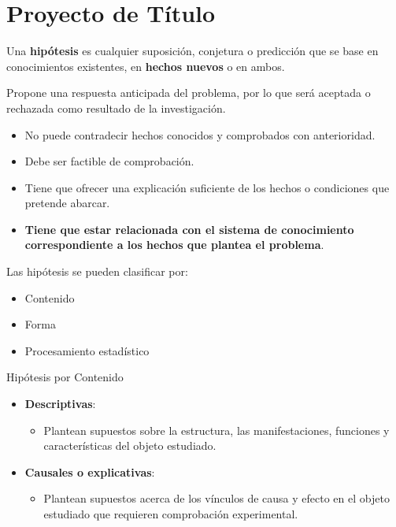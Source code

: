 \documentclass[letter,12pt]{report}
\newcommand\naranjo[1]{\textcolor[rgb]{1.00,0.36,0.06}{\textbf{#1}}}
\begin{document}
\chapter{Proyecto de Título}
Una \naranjo{hipótesis} es cualquier suposición, conjetura o predicción que se base en conocimientos existentes, en \naranjo{hechos nuevos} o en ambos.

 Propone una respuesta anticipada del problema, por lo que será aceptada o rechazada como resultado de la investigación.

\begin{itemize}
  \item No puede contradecir hechos conocidos y comprobados con anterioridad.
  \item Debe ser factible de comprobación.
  \item Tiene que ofrecer una explicación suficiente de los hechos o condiciones que pretende abarcar.
  \item \naranjo{Tiene que estar relacionada con el sistema de conocimiento correspondiente a los hechos que plantea el problema}.
\end{itemize}

Las hipótesis se pueden clasificar por:
 \begin{itemize}
  \item Contenido
  \item Forma
  \item Procesamiento estadístico
\end{itemize}

Hipótesis por Contenido
\begin{itemize}
  \item \textbf{Descriptivas}:
  \begin{itemize}
  \item Plantean supuestos sobre la estructura, las manifestaciones, funciones y características del objeto estudiado.
\end{itemize}

  \item \textbf{Causales o explicativas}:
  \begin{itemize}
  \item Plantean supuestos acerca de los vínculos de causa y efecto en el objeto estudiado que requieren comprobación experimental.
\end{itemize}

\end{itemize}
\end{document}
